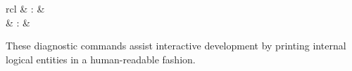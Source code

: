 \begin{isabellebody}
\begin{isamarkuptext}
\begin{matharray}{rcl}
    \hypertarget{command.full-prf}{\hyperlink{command.full-prf}{\mbox{}}} & : &  \\
    \hypertarget{command.pr}{\hyperlink{command.pr}{\mbox{}}} & : &  \\
  \end{matharray}

  These diagnostic commands assist interactive development by printing
  internal logical entities in a human-readable fashion.


\end{isamarkuptext}
\end{isabellebody}
